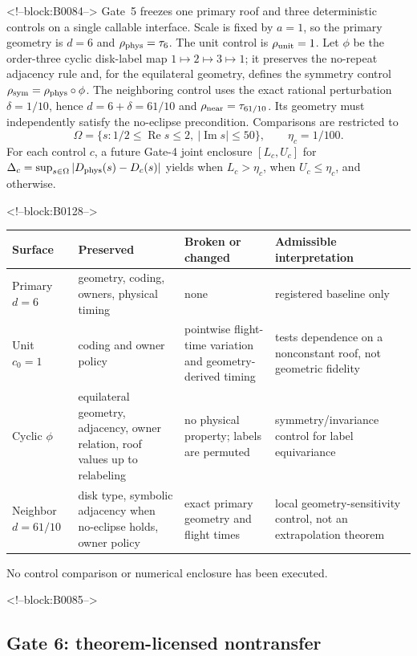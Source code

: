 \documentclass[11pt,a4paper]{article}
\begin{document}
<!--block:B0084-->
Gate~5 freezes one primary roof and three deterministic controls on a single
callable interface.  Scale is fixed by \(a=1\), so the primary geometry is
\(d=6\) and \(\rho_{\rm phys}=\tau_6\).  The unit control is
\(\rho_{\rm unit}=1\).  Let \(\phi\) be the order-three cyclic disk-label map
\(1\mapsto2\mapsto3\mapsto1\); it preserves the no-repeat adjacency rule and,
for the equilateral geometry, defines the symmetry control
\(\rho_{\rm sym}=\rho_{\rm phys}\circ\phi\).  The neighboring control uses
the exact rational perturbation \(\delta=1/10\), hence
\(d=6+\delta=61/10\) and \(\rho_{\rm near}=\tau_{61/10}\).  Its geometry must
independently satisfy the no-eclipse precondition.  Comparisons are restricted to
\[
  \Omega=\{s:1/2\leq\operatorname{Re}s\leq2,
  \ |\operatorname{Im}s|\leq50\},\qquad \eta_c=1/100.
\]
For each control \(c\), a future Gate-4 joint enclosure
\([L_c,U_c]\) for
\(\Delta_c=\sup_{s\in\Omega}|D_{\rm phys}(s)-D_c(s)|\) yields
 when \(L_c>\eta_c\),  when
\(U_c\leq\eta_c\), and  otherwise.

<!--block:B0128-->
\begin{center}
\small
\begin{tabularx}{\linewidth}{@{}lXXX@{}}
\toprule
Surface & Preserved & Broken or changed & Admissible interpretation \\
\midrule
Primary \(d=6\) & geometry, coding, owners, physical timing & none & registered baseline only \\
Unit \(c_0=1\) & coding and owner policy & pointwise flight-time variation and geometry-derived timing & tests dependence on a nonconstant roof, not geometric fidelity \\
Cyclic \(\phi\) & equilateral geometry, adjacency, owner relation, roof values up to relabeling & no physical property; labels are permuted & symmetry/invariance control for label equivariance \\
Neighbor \(d=61/10\) & disk type, symbolic adjacency when no-eclipse holds, owner policy & exact primary geometry and flight times & local geometry-sensitivity control, not an extrapolation theorem \\
\bottomrule
\end{tabularx}
\end{center}
No control comparison or numerical enclosure has been executed.

<!--block:B0085-->
\subsection{Gate 6: theorem-licensed nontransfer}
\end{document}
